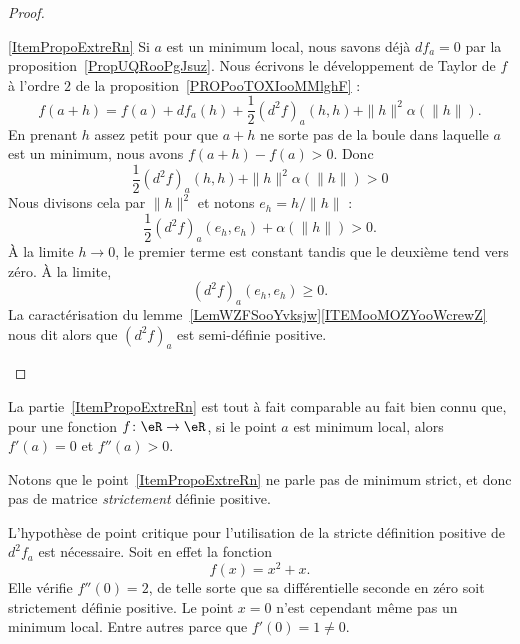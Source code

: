 \begin{proof}
\begin{subproof}
    \item[\ref{ItemPropoExtreRn}]
        Si \( a\) est un minimum local, nous savons déjà \( df_a=0\) par la proposition~\ref{PropUQRooPgJsuz}. Nous écrivons le développement de Taylor de \( f\) à l'ordre \( 2\) de la proposition~\ref{PROPooTOXIooMMlghF} :
        \begin{equation}
            f(a+h)=f(a)+df_a(h)+\frac{ 1 }{2}(d^2f)_a(h,h)+\| h \|^2\alpha(\| h \|).
        \end{equation}
        En prenant \( h\) assez petit pour que \( a+h\) ne sorte pas de la boule dans laquelle \( a\) est un minimum, nous avons \( f(a+h)-f(a)>0\). Donc
        \begin{equation}
            \frac{ 1 }{2}(d^2f)_a(h,h)+\| h \|^2\alpha(\| h \|)>0
        \end{equation}
        Nous divisons cela par \( \| h \|^2\) et notons \( e_h=h/\| h \|\) :
        \begin{equation}
            \frac{ 1 }{2}(d^2f)_a(e_h,e_h)+\alpha(\| h \|)>0.
        \end{equation}
        À la limite \( h\to 0\), le premier terme est constant tandis que le deuxième tend vers zéro. À la limite,
        \begin{equation}
            (d^2f)_a(e_h,e_h)\geq 0.
        \end{equation}
        La caractérisation du lemme~\ref{LemWZFSooYvksjw}\ref{ITEMooMOZYooWcrewZ} nous dit alors que \( (d^2f)_a\) est semi-définie positive.
    \end{subproof}
\end{proof}

La partie~\ref{ItemPropoExtreRn} est tout à fait comparable au fait bien connu que, pour une fonction \( f\colon \eR\to \eR\), si le point \( a\) est minimum local, alors \( f'(a)=0\) et \( f''(a)>0\).

Notons que le point~\ref{ItemPropoExtreRn} ne parle pas de minimum strict, et donc pas de matrice \emph{strictement} définie positive.

\begin{example}
    L'hypothèse de point critique pour l'utilisation de la stricte définition positive de \( d^2f_a\) est nécessaire. Soit en effet la fonction
    \begin{equation}
        f(x)=x^2+x.
    \end{equation}
    Elle vérifie \( f''(0)=2\), de telle sorte que sa différentielle seconde en zéro soit strictement définie positive. Le point \( x=0\) n'est cependant même pas un minimum local. Entre autres parce que \( f'(0)=1\neq 0\).
\end{example}

